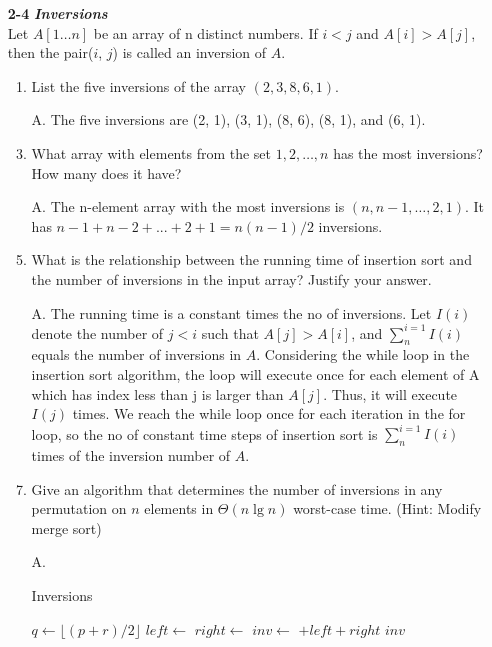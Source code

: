\documentclass[fontsize=12pt,paper=a4]{book}
\begin{document}
\begin{enumerate}
	\item[\textbf{2-4}]
	\textbf{\textit{Inversions}}\\
	Let $A[1 \dots n]$ be an array of n distinct numbers. If $i < j$ and $A[i] > A[j]$, then the pair($i$, $j$) is called an inversion of $A$.
	\begin{enumerate}
		\item List the five inversions of the array $(2, 3, 8, 6, 1)$.
		\item[A.]
		The five inversions are (2, 1), (3, 1), (8, 6), (8, 1), and (6, 1).
		
		\item What array with elements from the set ${1, 2,\dots,n}$ has the most inversions? How many does it have?
		\item[A.]
		The n-element array with the most inversions is $(n, n-1, \dots , 2, 1)$. It has $n-1+n-2+...+2+1 = n(n-1)/2$ inversions.
		
		\item What is the relationship between the running time of insertion sort and the number of inversions in the input array? Justify your answer.
		\item[A.]
		The running time is a constant times the no of inversions. Let $I(i)$ denote the number of $j < i$ such that $A[j] > A[i]$, and $\sum_{n}^{i=1} I(i)$ equals the number of inversions in $A$. Considering the while loop in the insertion sort algorithm, the loop will execute once for each element of A which has index less than j is larger than $A[j]$. Thus, it will execute $I(j)$ times. We reach the while loop once for each iteration in the for loop, so the no of constant time steps of insertion sort is  $\sum_{n}^{i=1} I(i)$ times of the inversion number of $A$.
		
		\item Give an algorithm that determines the number of inversions in any permutation on $n$ elements in $\Theta(n \lg n)$ worst-case time. (Hint: Modify merge sort)
		\item[A.]
		\begin{algorithm}
			\caption{Inversions}
			\begin{algorithmic}
						\State $q \gets \lfloor (p+r)/2 \rfloor $
						\State $left \gets$ 
						\State $right \gets$ 
						\State $inv \gets$ $ + left + right$
						\State \Return $inv$
					\EndIf
					\State {}
				\EndProcedure
			\end{algorithmic}
		\end{algorithm}
		

\end{enumerate}
\end{enumerate}
\end{document}
